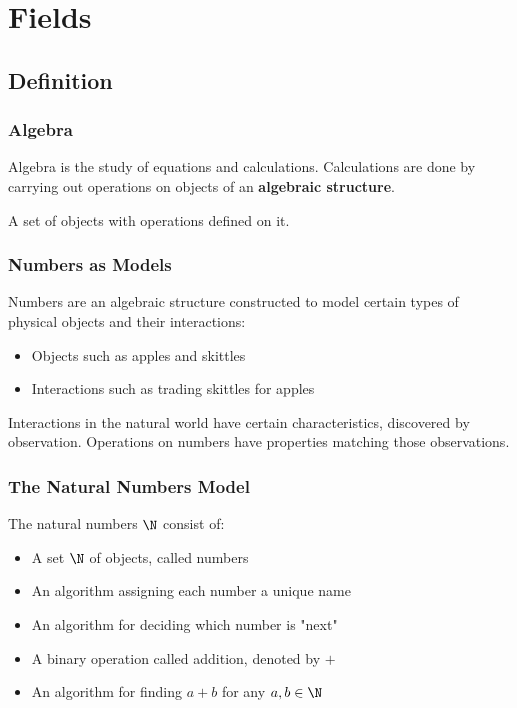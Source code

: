 \setcounter{chapter}{0}
\chapter{Fields}
\section{Definition}

\subsection{Algebra}

Algebra is the study of equations and calculations. Calculations are done by carrying out operations on objects of an \textbf{algebraic structure}.

\begin{definition*}
    A set of objects with operations defined on it.
\end{definition*}

\subsection{Numbers as Models}

Numbers are an algebraic structure constructed to model certain types of physical objects and their interactions:
\begin{itemize}
    \item Objects such as apples and skittles
    \item Interactions such as trading skittles for apples
\end{itemize}

Interactions in the natural world have certain characteristics, discovered by observation. Operations on numbers have properties matching those observations.


\subsection{The Natural Numbers Model}

The natural numbers $\N$ consist of:
\begin{itemize}
    \item A set $\N$ of objects, called numbers
    \item An algorithm assigning each number a unique name
    \item An algorithm for deciding which number is "next"
    \item A binary operation called addition, denoted by $+$
    \item An algorithm for finding $a + b$ for any $a, b \in \N$
\end{itemize}

